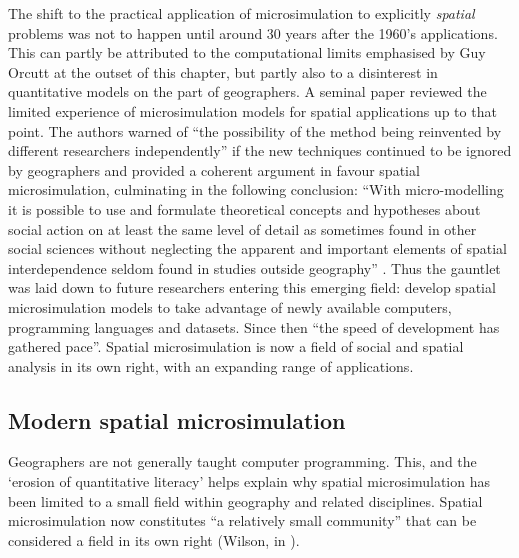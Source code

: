 The shift to the practical application of microsimulation to explicitly
\emph{spatial} problems was not to happen until around 30 years after the
1960's applications. This can partly be attributed to the
computational limits emphasised by Guy Orcutt at the outset of this chapter, but
partly also to a disinterest in quantitative models on the part of geographers.
A seminal paper \citep{Holm1987} reviewed the limited experience of
microsimulation models for
spatial applications up to that point. The authors warned of ``the
possibility of the method being reinvented by different
researchers independently'' if the new techniques continued to be ignored by
geographers \citep[p.~145]{Holm1987} and provided a coherent argument in favour
spatial microsimulation, culminating in the following conclusion:
``With micro-modelling it is possible to use and formulate theoretical concepts
and hypotheses about social action on at least the same level of detail as
sometimes found in other social sciences  without neglecting the apparent and
important elements of spatial interdependence seldom found in studies outside
geography'' \citep[p.~163]{Holm1987}.
Thus the gauntlet was laid down to future
researchers entering this emerging field: develop spatial microsimulation models
to take advantage of newly available computers, programming languages and
datasets. Since then ``the speed of development has gathered
pace''\citep[p.~259]{clarke2013conclusions}. Spatial microsimulation is now a
field of social and spatial analysis in its own right, with an expanding range
of applications. 

\subsection{Modern spatial microsimulation}
Geographers are not generally taught computer programming.
This, and the `erosion of quantitative literacy' \citep{ESRC2013}
helps explain why spatial microsimulation has been limited to a
small field within geography and related disciplines. Spatial
microsimulation now constitutes ``a relatively small
community'' that can be considered a field in its own right
(Wilson, in \citealp[p.~vi]{Tanton2013}).

